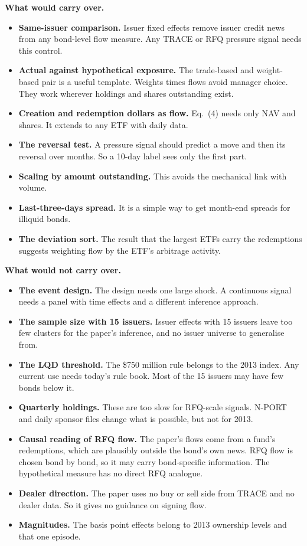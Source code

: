 \documentclass[10pt,a4paper]{article}
\begin{document}
\textbf{What would carry over.}
\begin{itemize}
\item \textbf{Same-issuer comparison.} Issuer fixed effects remove issuer credit news from any bond-level flow measure. Any TRACE or RFQ pressure signal needs this control.
\item \textbf{Actual against hypothetical exposure.} The trade-based and weight-based pair is a useful template. Weights times flows avoid manager choice. They work wherever holdings and shares outstanding exist.
\item \textbf{Creation and redemption dollars as flow.} Eq.~(4) needs only NAV and shares. It extends to any ETF with daily data.
\item \textbf{The reversal test.} A pressure signal should predict a move and then its reversal over months. So a 10-day label sees only the first part.
\item \textbf{Scaling by amount outstanding.} This avoids the mechanical link with volume.
\item \textbf{Last-three-days spread.} It is a simple way to get month-end spreads for illiquid bonds.
\item \textbf{The deviation sort.} The result that the largest ETFs carry the redemptions suggests weighting flow by the ETF's arbitrage activity.
\end{itemize}

\textbf{What would not carry over.}
\begin{itemize}
\item \textbf{The event design.} The design needs one large shock. A continuous signal needs a panel with time effects and a different inference approach.
\item \textbf{The sample size with 15 issuers.} Issuer effects with 15 issuers leave too few clusters for the paper's inference, and no issuer universe to generalise from.
\item \textbf{The LQD threshold.} The \$750 million rule belongs to the 2013 index. Any current use needs today's rule book. Most of the 15 issuers may have few bonds below it.
\item \textbf{Quarterly holdings.} These are too slow for RFQ-scale signals. N-PORT and daily sponsor files change what is possible, but not for 2013.
\item \textbf{Causal reading of RFQ flow.} The paper's flows come from a fund's redemptions, which are plausibly outside the bond's own news. RFQ flow is chosen bond by bond, so it may carry bond-specific information. The hypothetical measure has no direct RFQ analogue.
\item \textbf{Dealer direction.} The paper uses no buy or sell side from TRACE and no dealer data. So it gives no guidance on signing flow.
\item \textbf{Magnitudes.} The basis point effects belong to 2013 ownership levels and that one episode.
\end{itemize}
\end{document}

